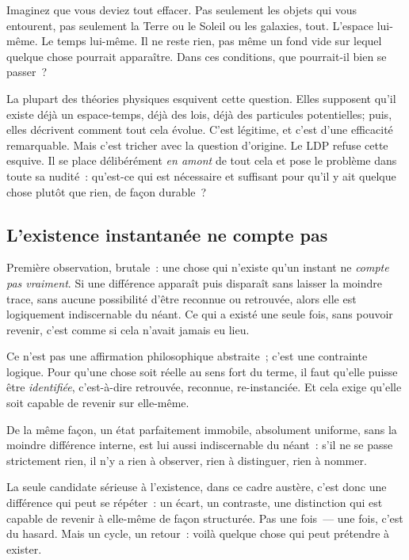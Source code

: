 \documentclass[12pt, a4paper, openright]{book}
\begin{document}
Imaginez que vous deviez tout effacer. Pas seulement les objets qui vous entourent, pas seulement la Terre ou le Soleil ou les galaxies, tout. L'espace lui-même. Le temps lui-même. Il ne reste rien, pas même un fond vide sur lequel quelque chose pourrait apparaître. Dans ces conditions, que pourrait-il bien se passer~?

\medskip

La plupart des théories physiques esquivent cette question. Elles supposent qu'il existe déjà un espace-temps, déjà des lois, déjà des particules potentielles; puis, elles décrivent comment tout cela évolue. C'est légitime, et c'est d'une efficacité remarquable. Mais c'est tricher avec la question d'origine. Le LDP refuse cette esquive. Il se place délibérément \emph{en amont} de tout cela et pose le problème dans toute sa nudité~: qu'est-ce qui est nécessaire et suffisant pour qu'il y ait quelque chose plutôt que rien, de façon durable~?

\subsection*{L'existence instantanée ne compte pas}

Première observation, brutale~: une chose qui n'existe qu'un instant ne \emph{compte pas vraiment}. Si une différence apparaît puis disparaît sans laisser la moindre trace, sans aucune possibilité d'être reconnue ou retrouvée, alors elle est logiquement indiscernable du néant. Ce qui a existé une seule fois, sans pouvoir revenir, c'est comme si cela n'avait jamais eu lieu.

\medskip

Ce n'est pas une affirmation philosophique abstraite~; c'est une contrainte logique. Pour qu'une chose soit réelle au sens fort du terme, il faut qu'elle puisse être \emph{identifiée}, c'est-à-dire retrouvée, reconnue, re-instanciée. Et cela exige qu'elle soit capable de revenir sur elle-même.

\medskip

De la même façon, un état parfaitement immobile, absolument uniforme, sans la moindre différence interne, est lui aussi indiscernable du néant~: s'il ne se passe strictement rien, il n'y a rien à observer, rien à distinguer, rien à nommer.

\medskip

La seule candidate sérieuse à l'existence, dans ce cadre austère, c'est donc une différence qui peut se répéter~: un écart, un contraste, une distinction qui est capable de revenir à elle-même de façon structurée. Pas une fois~--- une fois, c'est du hasard. Mais un cycle, un retour~: voilà quelque chose qui peut prétendre à exister.
\end{document}
